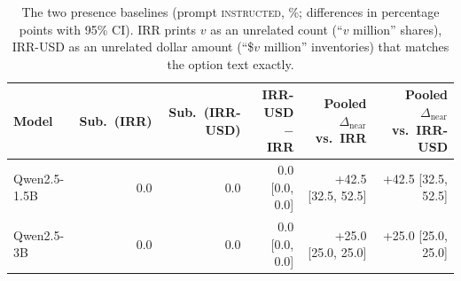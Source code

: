 \begin{table}[t]
\centering
\small
\begin{tabular}{lrrrrr}
\toprule
Model & Sub.\ (IRR) & Sub.\ (IRR-USD) & IRR-USD $-$ IRR & Pooled $\Delta_{\text{near}}$ vs.\ IRR & Pooled $\Delta_{\text{near}}$ vs.\ IRR-USD \\
\midrule
Qwen2.5-1.5B & 0.0 & 0.0 & 0.0 [0.0, 0.0] & +42.5 [32.5, 52.5] & +42.5 [32.5, 52.5] \\
Qwen2.5-3B & 0.0 & 0.0 & 0.0 [0.0, 0.0] & +25.0 [25.0, 25.0] & +25.0 [25.0, 25.0] \\
\bottomrule
\end{tabular}
\caption{The two presence baselines (prompt \textsc{instructed}, \%; differences in percentage points with 95\% CI). IRR prints $v$ as an unrelated count (``$v$ million'' shares), IRR-USD as an unrelated dollar amount (``\$$v$ million'' inventories) that matches the option text exactly.}
\label{tab:irr}
\end{table}
